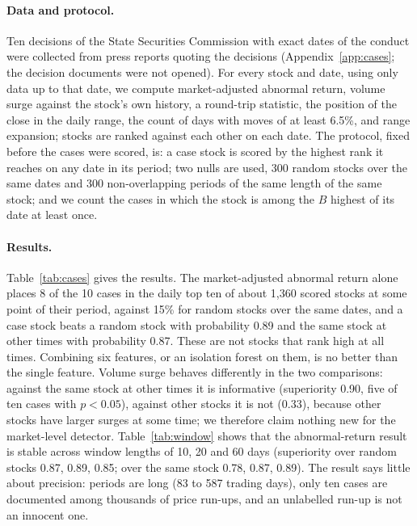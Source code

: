 \documentclass[11pt,a4paper]{article}
\begin{document}
\paragraph{Data and protocol.} Ten decisions of the State Securities Commission with exact dates of the conduct were collected from press reports quoting the decisions (Appendix~\ref{app:cases}; the decision documents were not opened). For every stock and date, using only data up to that date, we compute market-adjusted abnormal return, volume surge against the stock's own history, a round-trip statistic, the position of the close in the daily range, the count of days with moves of at least 6.5\%, and range expansion; stocks are ranked against each other on each date. The protocol, fixed before the cases were scored, is: a case stock is scored by the highest rank it reaches on any date in its period; two nulls are used, 300 random stocks over the same dates and 300 non-overlapping periods of the same length of the same stock; and we count the cases in which the stock is among the $B$ highest of its date at least once.

\paragraph{Results.} Table~\ref{tab:cases} gives the results. The market-adjusted abnormal return alone places 8 of the 10 cases in the daily top ten of about 1,360 scored stocks at some point of their period, against 15\% for random stocks over the same dates, and a case stock beats a random stock with probability 0.89 and the same stock at other times with probability 0.87. These are not stocks that rank high at all times. Combining six features, or an isolation forest on them, is no better than the single feature. Volume surge behaves differently in the two comparisons: against the same stock at other times it is informative (superiority 0.90, five of ten cases with $p<0.05$), against other stocks it is not (0.33), because other stocks have larger surges at some time; we therefore claim nothing new for the market-level detector. Table~\ref{tab:window} shows that the abnormal-return result is stable across window lengths of 10, 20 and 60 days (superiority over random stocks 0.87, 0.89, 0.85; over the same stock 0.78, 0.87, 0.89). The result says little about precision: periods are long (83 to 587 trading days), only ten cases are documented among thousands of price run-ups, and an unlabelled run-up is not an innocent one.

\begin{table}[t]
\centering\small
{}
\caption{Ten documented cases scored against about 1,360 stocks (20-day window). Superiority is the probability that a case stock beats a random stock (0.5 is chance); ``top $B$'' counts cases in which the stock reached the daily top-$B$ list at some date of its period; ``chance'' is the same share for random stocks.}\label{tab:cases}
\end{table}
\end{document}

